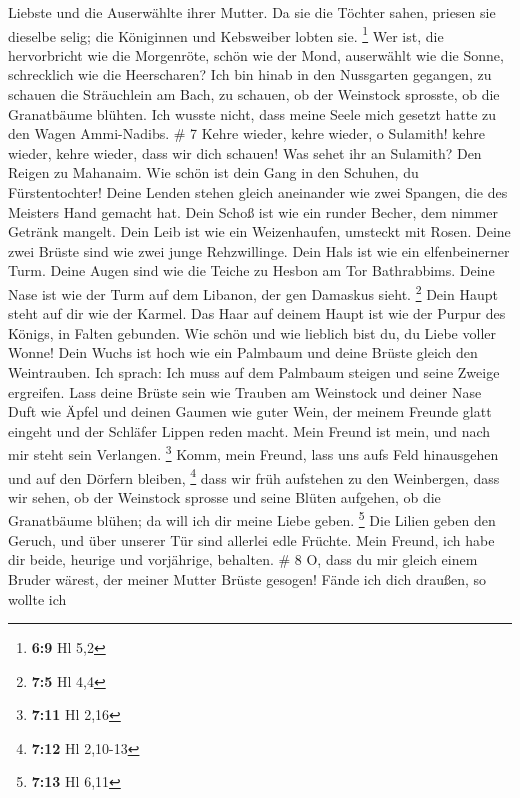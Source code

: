 Liebste und die Auserwählte ihrer Mutter. Da sie die Töchter sahen,
priesen sie dieselbe selig; die Königinnen und Kebsweiber lobten sie.
\footnote{\textbf{6:9} Hl 5,2}  Wer ist, die hervorbricht
wie die Morgenröte, schön wie der Mond, auserwählt wie die Sonne,
schrecklich wie die Heerscharen?  Ich bin hinab in den
Nussgarten gegangen, zu schauen die Sträuchlein am Bach, zu schauen, ob
der Weinstock sprosste, ob die Granatbäume blühten.  Ich
wusste nicht, dass meine Seele mich gesetzt hatte zu den Wagen
Ammi-Nadibs. \# 7  Kehre wieder, kehre wieder, o Sulamith!
kehre wieder, kehre wieder, dass wir dich schauen! Was sehet ihr an
Sulamith? Den Reigen zu Mahanaim.  Wie schön ist dein Gang
in den Schuhen, du Fürstentochter! Deine Lenden stehen gleich aneinander
wie zwei Spangen, die des Meisters Hand gemacht hat.  Dein
Schoß ist wie ein runder Becher, dem nimmer Getränk mangelt. Dein Leib
ist wie ein Weizenhaufen, umsteckt mit Rosen.  Deine zwei
Brüste sind wie zwei junge Rehzwillinge.  Dein Hals ist wie
ein elfenbeinerner Turm. Deine Augen sind wie die Teiche zu Hesbon am
Tor Bathrabbims. Deine Nase ist wie der Turm auf dem Libanon, der gen
Damaskus sieht. \footnote{\textbf{7:5} Hl 4,4}  Dein Haupt
steht auf dir wie der Karmel. Das Haar auf deinem Haupt ist wie der
Purpur des Königs, in Falten gebunden.  Wie schön und wie
lieblich bist du, du Liebe voller Wonne!  Dein Wuchs ist
hoch wie ein Palmbaum und deine Brüste gleich den Weintrauben.
 Ich sprach: Ich muss auf dem Palmbaum steigen und seine
Zweige ergreifen. Lass deine Brüste sein wie Trauben am Weinstock und
deiner Nase Duft wie Äpfel  und deinen Gaumen wie guter
Wein, der meinem Freunde glatt eingeht und der Schläfer Lippen reden
macht.  Mein Freund ist mein, und nach mir steht sein
Verlangen. \footnote{\textbf{7:11} Hl 2,16}  Komm, mein
Freund, lass uns aufs Feld hinausgehen und auf den Dörfern bleiben,
\footnote{\textbf{7:12} Hl 2,10-13}  dass wir früh
aufstehen zu den Weinbergen, dass wir sehen, ob der Weinstock sprosse
und seine Blüten aufgehen, ob die Granatbäume blühen; da will ich dir
meine Liebe geben. \footnote{\textbf{7:13} Hl 6,11}  Die
Lilien geben den Geruch, und über unserer Tür sind allerlei edle
Früchte. Mein Freund, ich habe dir beide, heurige und vorjährige,
behalten. \# 8  O, dass du mir gleich einem Bruder wärest,
der meiner Mutter Brüste gesogen! Fände ich dich draußen, so wollte ich
